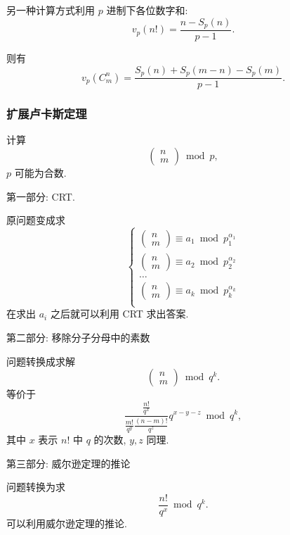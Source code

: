 \documentclass[UTF8, a4paper, titlepage, twoside]{ctexart}
\begin{document}
另一种计算方式利用 $p$ 进制下各位数字和:
\[
v_p(n!) = \frac{n - S_p(n)}{p - 1}.
\]

则有
\[
v_p(C_m^n) = \frac{S_p(n) + S_p(m - n) - S_p(m)}{p - 1}.
\]

\subsubsection*{ 扩展卢卡斯定理 }

计算
\[
\left( \begin{array}{c} n \\ m \end{array} \right) \bmod p,
\]
\(p\) 可能为合数.

第一部分: CRT.

原问题变成求
\[
\begin{cases}
\left( \begin{array}{c} n \\ m \end{array} \right) \equiv a_1 \bmod p_1^{\alpha_1} \\
\left( \begin{array}{c} n \\ m \end{array} \right) \equiv a_2 \bmod p_2^{\alpha_2} \\
\dots \\
\left( \begin{array}{c} n \\ m \end{array} \right) \equiv a_k \bmod p_k^{\alpha_k} \\
\end{cases}
\]
在求出 \(a_i\) 之后就可以利用 CRT 求出答案.

第二部分: 移除分子分母中的素数

问题转换成求解
\[
    \left(\begin{array}{c} n \\ m \end{array}\right) \bmod q^k.
\]
等价于
\[
\frac{\frac{n!}{q^x}}{\frac{m!}{q^y}\frac{(n - m)!}{q^z}} q^{x - y - z} \bmod q^k,
\]
其中 \(x\) 表示 \(n!\) 中 \(q\) 的次数, \(y, z\) 同理.

第三部分: 威尔逊定理的推论

问题转换为求
\[
\frac{n!}{q^x} \bmod q^k.
\]
可以利用威尔逊定理的推论.
\end{document}
